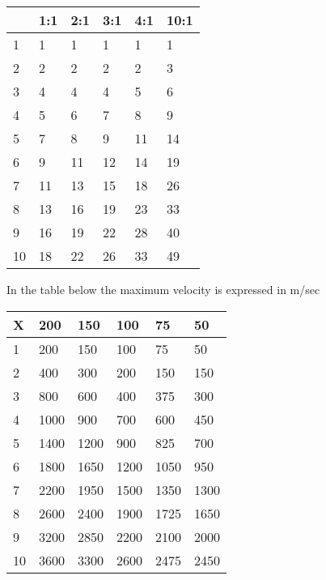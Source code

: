 \begin{tabular}{||l||l|l|l|l|l||} \hline 
     &  1:1   &   2:1  &    3:1   &   4:1  &   10:1  \\ \hline
1    &    1   &     1  &      1   &     1  &      1  \\
2    &    2   &     2  &      2   &     2  &      3  \\
3    &    4   &     4  &      4   &     5  &      6  \\
4    &    5   &     6  &      7   &     8  &      9  \\
5    &    7   &     8  &      9   &    11  &     14  \\
6    &    9   &    11  &     12   &    14  &     19  \\
7    &   11   &    13  &     15   &    18  &     26  \\
8    &   13   &    16  &     19   &    23  &     33  \\
9    &   16   &    19  &     22   &    28  &     40  \\
10   &   18   &    22  &     26   &    33  &     49  \\ \hline 
\end{tabular}
   
In the table below the maximum velocity is expressed in m/sec

\begin{tabular}{||l|l|l|l|l|l||} \hline 
X &     200 &      150 &     100 &      75 &      50 \\ \hline
1 &     200 &      150 &     100 &      75 &      50 \\
2 &     400 &      300 &     200 &     150 &     150 \\
3 &     800 &      600 &     400 &     375 &     300 \\
4 &    1000 &      900 &     700 &     600 &     450 \\
5 &    1400 &     1200 &     900 &     825 &     700 \\
6 &    1800 &     1650 &    1200 &    1050 &     950 \\
7 &    2200 &     1950 &    1500 &    1350 &    1300 \\
8 &    2600 &     2400 &    1900 &    1725 &    1650 \\
9 &    3200 &     2850 &    2200 &    2100 &    2000 \\
10&    3600 &     3300 &    2600 &    2475 &    2450 \\ \hline 
\end{tabular}

